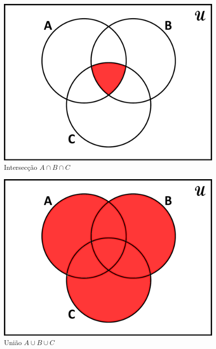 \begin{figure}[ht!]
  \centering
  \includegraphics[scale=0.3]{figures/sets/fig_sets_03_11.pdf}
  \caption{Intersecção $A \cap B \cap C$}
  \label{fig:sets_03_11}
\end{figure}

\begin{figure}[ht!]
  \centering
  \includegraphics[scale=0.3]{figures/sets/fig_sets_03_12.pdf}
  \caption{União $A \cup B \cup C$}
  \label{fig:sets_03_12}
\end{figure}

